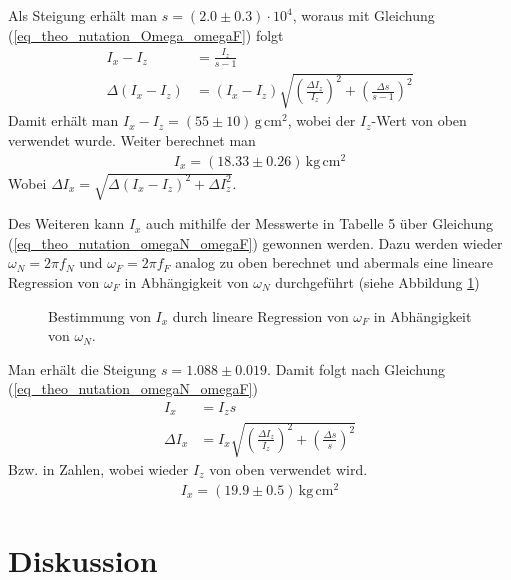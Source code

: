 \documentclass[12pt,a4paper,german]{scrartcl}
\numberwithin{equation}{section}
\begin{document}
  Als Steigung erhält man $s = (2.0 \pm 0.3) \cdot 10^4$, woraus mit Gleichung (\ref{eq_theo_nutation_Omega_omegaF}) folgt
  \begin{align}
    I_x - I_z &= \frac{I_z}{s - 1} \nonumber \\
    \Delta(I_x - I_z) &= (I_x - I_z) \sqrt{\left(\frac{\Delta I_z}{I_z}\right)^2 + \left(\frac{\Delta s}{s - 1}\right)^2}
  \end{align}
  Damit erhält man $I_x - I_z = (55 \pm 10) \, \text{g} \, \text{cm}^2$, wobei der $I_z$-Wert von oben verwendet wurde. Weiter berechnet man
  \begin{align}
    I_x = (18.33 \pm 0.26) \, \text{kg} \, \text{cm}^2
  \end{align}
  Wobei $\Delta I_x = \sqrt{\Delta(I_x - I_z)^2 + \Delta I_z^2}$.

  Des Weiteren kann $I_x$ auch mithilfe der Messwerte in Tabelle 5 über Gleichung (\ref{eq_theo_nutation_omegaN_omegaF}) gewonnen werden.
  Dazu werden wieder $\omega_N = 2 \pi f_N$ und $\omega_F = 2 \pi f_F$ analog zu oben berechnet und abermals eine lineare Regression von $\omega_F$ in Abhängigkeit von $\omega_N$ durchgeführt (siehe Abbildung \ref{fig_I_x_2})

  \begin{figure}[H]
    \centering
    
    \caption{Bestimmung von $I_x$ durch lineare Regression von $\omega_F$ in Abhängigkeit von $\omega_N$.}
    \label{fig_I_x_2}
  \end{figure}

  Man erhält die Steigung $s = 1.088 \pm 0.019$. Damit folgt nach Gleichung (\ref{eq_theo_nutation_omegaN_omegaF})
  \begin{align}
    I_x &= I_z s \nonumber \\
    \Delta I_x &= I_x \sqrt{\left(\frac{\Delta I_z}{I_z}\right)^2 + \left(\frac{\Delta s}{s}\right)^2}
  \end{align}
  Bzw. in Zahlen, wobei wieder $I_z$ von oben verwendet wird.
  \begin{align}
    I_x = (19.9 \pm 0.5) \, \text{kg} \, \text{cm}^2
  \end{align}

  \newpage
  \section{Diskussion}
\end{document}
